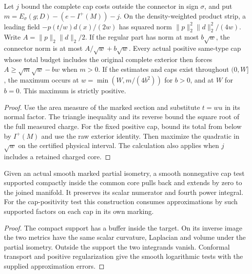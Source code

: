 \begin{proposition}
\label{prop:ed45-width-mismatch}
\leanok
Let $j$ bound the complete cap costs outside the connector in sign $\sigma$,
and put $m=E_\sigma(g;D)-(e-I^+(M))-j$. On the density-weighted product
strip, a leading field $-p(t/w)d(x)/(2w)$ has squared norm
$\|p\|_2^2\|d\|_2^2/(4w)$. Write $A=\|p\|_2\|d\|_2/2$. If the regular
part has norm at most $b\sqrt w$, the connector norm is at most
$A/\sqrt w+b\sqrt w$. Every actual positive same-type cap whose total
budget includes the original complete exterior then forces
$A\ge\sqrt m\sqrt w-bw$ when $m>0$. If the estimates and caps exist
throughout $(0,W]$, the maximum occurs at $w=\min(W,m/(4b^2))$ for
$b>0$, and at $W$ for $b=0$. This maximum is strictly positive.
\end{proposition}
\begin{proof}
\leanok
Use the area measure of the marked section and substitute $t=wu$ in its
normal factor. The triangle inequality and its reverse bound the square
root of the full measured charge. For the fixed positive cap, bound its
total from below by $I^+(M)$ and use the raw exterior identity. Then
maximize the quadratic in $\sqrt w$ on the certified physical interval.
The calculation also applies when $j$ includes a retained charged core.
\end{proof}

\begin{proposition}
\label{prop:ed45-cap-transplant}
\leanok
Given an actual smooth marked partial isometry, a smooth nonnegative cap
test supported compactly inside the common core pulls back and extends by
zero to the joined manifold. It preserves its scalar numerator and fourth
power integral. For the cap-positivity test this construction consumes
approximations by such supported factors on each cap in its own marking.
\end{proposition}
\begin{proof}
\leanok
The compact support has a buffer inside the target. On its inverse image
the two metrics have the same scalar curvature, Laplacian and volume
under the partial isometry. Outside the support the two integrands
vanish. Conformal transport and positive regularization give the smooth
logarithmic tests with the supplied approximation errors.
\end{proof}

